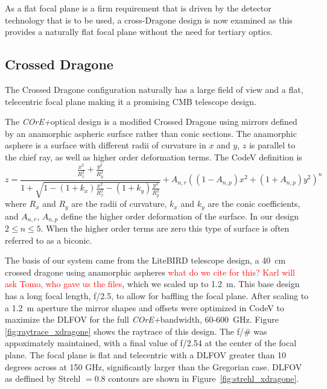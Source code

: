 \documentclass[11pt,a4paper]{article}
\newcommand{\comred}[1]{\textcolor{red}{#1}}
\newcommand{\coreplus}{\textit{\negthinspace COrE+\/}}
\begin{document}
As a flat focal plane is a firm requirement that is driven by the detector technology that is to be used, a cross-Dragone design is now examined as this provides a naturally flat focal plane without the need for tertiary optics.

\subsection{Crossed Dragone}

The Crossed Dragone configuration \cite{tran_2008, granet_2001} naturally has a large 
field of view and a flat, telecentric focal plane making it a promising CMB telescope design. 


The \coreplus optical design is a modified Crossed Dragone using mirrors defined by an anamorphic aspheric 
surface rather than conic sections. 
The anamorphic asphere is a surface with different radii of curvature in $x$ and $y$, $z$ is parallel to 
the chief ray, 
as well as higher order deformation terms.
The CodeV definition is 
$$ z = \frac{\frac{x^2}{R_x^2} + \frac{y^2}{R_y^2}}
{ 1 + \sqrt{1 - (1+k_x) \frac{x^2}{R_x^2} - (1+k_y) \frac{y^2}{R_y^2}}}
+ A_{n,r} ( (1-A_{n,p})x^2 + (1 + A_{n,p})y^2)^n
$$
where $R_x$ and $R_y$ are the radii of curvature, $k_x$ and $k_y$ are the conic coefficients, and $A_{n,r}$, $A_{n,p}$
define the higher order deformation of the surface. In our design $2 \leq n \leq 5$. When the higher order terms are zero this 
type of surface is often referred to as a biconic.

The basis of our system came from the LiteBIRD telescope design, a 40~cm crossed dragone using anamorphic 
aspheres 
\cite{litebird} \comred{what do we cite for this? Karl will ask Tomo, who gave us the files}, which we scaled up to 1.2~m. 
This base design has a long focal length, f/2.5, to allow 
for baffling the focal plane.  After scaling to a 1.2~m aperture the mirror shapes and offsets were optimized 
in CodeV to maximize the DLFOV for the full \coreplus bandwidth, 60-600~GHz.  
Figure \ref{fig:raytrace_xdragone} 
shows the raytrace of this design. The f/\# was appoximately maintained, with a final value of f/2.54 at the 
center of the focal plane.
The focal plane is flat and telecentric with a DLFOV greater than 10 degrees across at 150 GHz, significantly larger than the 
Gregorian case.  DLFOV as deffined by Strehl $=0.8$ contours are shown in Figure~\ref{fig:strehl_xdragone}.
\end{document}
